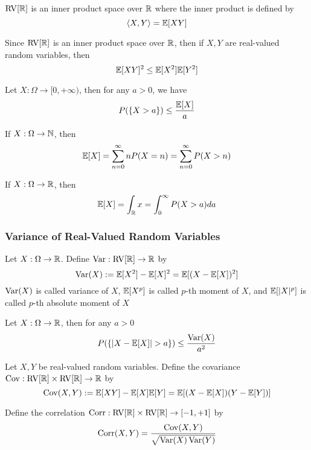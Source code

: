 \documentclass{report}
\begin{document}
\begin{proposition}
    $\operatorname{RV}[\mathbb{R}]$ is an inner product space over $\mathbb{R}$ where the inner product is defined by
    $$
        \langle X, Y\rangle = \mathbb{E}[XY]
    $$
\end{proposition}

\begin{theorem}
	Since $\operatorname{RV}[\mathbb{R}]$ is an inner product space over $\mathbb{R}$, then if $X, Y$ are real-valued random variables, then
    $$
        \mathbb{E}[XY]^2 \leq \mathbb{E}[X^2] \mathbb{E}[Y^2]
    $$
\end{theorem}

\begin{theorem}
    Let $X: \Omega \to [0, +\infty)$, then for any $a > 0$, we have
    $$
        P(\{X > a\}) \leq \frac{\mathbb{E}[X]}{a}
    $$
\end{theorem}

\begin{proposition}
	If $X: \Omega \to \mathbb{N}$, then
	$$
		\mathbb{E}[X] = \sum_{n=0}^\infty n P(X = n) = \sum_{n=0}^\infty P(X > n)
	$$
	
	If $X: \Omega \to \mathbb{R}$, then
	$$
		\mathbb{E}[X] = \int_{\mathbb{R}} x  = \int_0^\infty P(X > a) da
	$$
\end{proposition}

\subsubsection{Variance of Real-Valued Random Variables}

\begin{definition}
    Let $X: \Omega \to \mathbb{R}$. Define $\operatorname{Var}: \operatorname{RV}[\mathbb{R}] \to \mathbb{R}$ by
    $$
        \operatorname{Var}(X) := \mathbb{E}[X^2] - \mathbb{E}[X]^2 = \mathbb{E}[(X - \mathbb{E}[X])^2]
    $$
    $\operatorname{Var}(X)$ is called variance of $X$, $\mathbb{E}[X^p]$ is called $p$-th moment of $X$, and $\mathbb{E}[|X|^p]$ is called $p$-th absolute moment of $X$
\end{definition}

\begin{definition}
    Let $X: \Omega \to \mathbb{R}$, then for any $a > 0$
    $$
        P(\{|X - \mathbb{E}[X]| > a\}) \leq \frac{\operatorname{Var}(X)}{a^2}
    $$
\end{definition}

\begin{definition}
    Let $X, Y$ be real-valued random variables. Define the covariance $\operatorname{Cov}: \operatorname{RV}[\mathbb{R}] \times \operatorname{RV}[\mathbb{R}] \to \mathbb{R}$ by
    $$
        \operatorname{Cov}(X, Y) := \mathbb{E}[XY] - \mathbb{E}[X]\mathbb{E}[Y] = \mathbb{E}[(X - \mathbb{E}[X]) (Y - \mathbb{E}[Y])]
    $$
    
    Define the correlation $\operatorname{Corr}: \operatorname{RV}[\mathbb{R}] \times \operatorname{RV}[\mathbb{R}] \to [-1, +1]$ by
    $$
    	\operatorname{Corr}(X, Y) = \frac{\operatorname{Cov}(X, Y)}{\sqrt{\operatorname{Var}(X) \operatorname{Var}(Y)}}
    $$
\end{definition}
\end{document}
